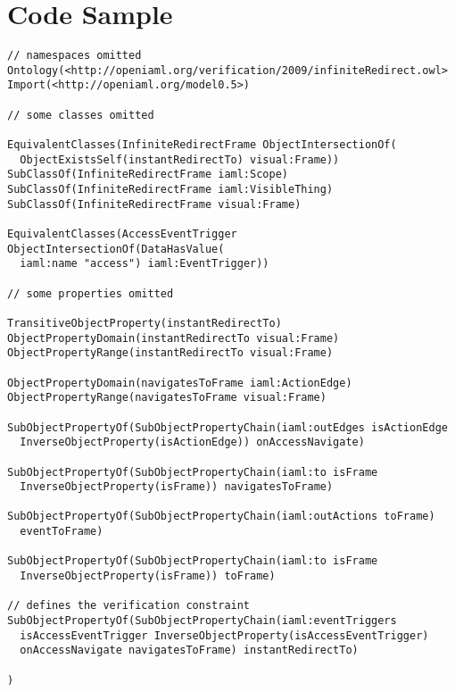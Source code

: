 \chapter{Code Sample}

\begin{verbatim}
// namespaces omitted
Ontology(<http://openiaml.org/verification/2009/infiniteRedirect.owl>
Import(<http://openiaml.org/model0.5>)

// some classes omitted

EquivalentClasses(InfiniteRedirectFrame ObjectIntersectionOf(
  ObjectExistsSelf(instantRedirectTo) visual:Frame))
SubClassOf(InfiniteRedirectFrame iaml:Scope)
SubClassOf(InfiniteRedirectFrame iaml:VisibleThing)
SubClassOf(InfiniteRedirectFrame visual:Frame)

EquivalentClasses(AccessEventTrigger ObjectIntersectionOf(DataHasValue(
  iaml:name "access") iaml:EventTrigger))
  
// some properties omitted

TransitiveObjectProperty(instantRedirectTo)
ObjectPropertyDomain(instantRedirectTo visual:Frame)
ObjectPropertyRange(instantRedirectTo visual:Frame)

ObjectPropertyDomain(navigatesToFrame iaml:ActionEdge)
ObjectPropertyRange(navigatesToFrame visual:Frame)

SubObjectPropertyOf(SubObjectPropertyChain(iaml:outEdges isActionEdge 
  InverseObjectProperty(isActionEdge)) onAccessNavigate)
  
SubObjectPropertyOf(SubObjectPropertyChain(iaml:to isFrame 
  InverseObjectProperty(isFrame)) navigatesToFrame)
  
SubObjectPropertyOf(SubObjectPropertyChain(iaml:outActions toFrame) 
  eventToFrame)

SubObjectPropertyOf(SubObjectPropertyChain(iaml:to isFrame 
  InverseObjectProperty(isFrame)) toFrame)

// defines the verification constraint
SubObjectPropertyOf(SubObjectPropertyChain(iaml:eventTriggers 
  isAccessEventTrigger InverseObjectProperty(isAccessEventTrigger) 
  onAccessNavigate navigatesToFrame) instantRedirectTo)

)
\end{verbatim}
